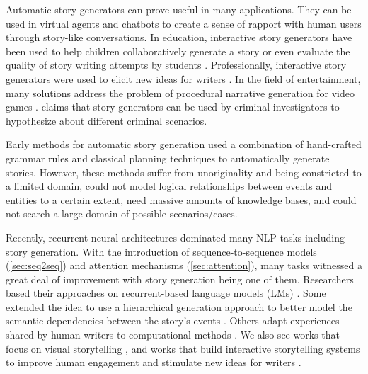 Automatic story generators can prove useful in many applications. They can be used in virtual agents and chatbots to create a sense of rapport with human users through story-like conversations. In education, interactive story generators have been used to help children collaboratively generate a story \citep{robertson2003using} or even evaluate the quality of story writing attempts by students \citep{halpin2004towards}. Professionally, interactive story generators were used to elicit new ideas for writers \citep{clark2018creative}. In the field of entertainment, many solutions address the problem of procedural narrative generation for video games \citep{griffith2018procedural}. \citep{martin2021neurosymbolic} claims that story generators can be used by criminal investigators to hypothesize about different criminal scenarios.

Early methods for automatic story generation used a combination of hand-crafted grammar rules \citep{ryan2017grimes, rumelhart1975notes, thorndyke1977cognitive, wilensky1983story} and classical planning techniques \citep{meehan1977tale, dehn1981story, lebowitz1984creating, lebowitz1985story, cavazza2002character, porteous2009controlling, riedl2010narrative} to automatically generate stories. However, these methods suffer from unoriginality and being constricted to a limited domain, could not model logical relationships between events and entities to a certain extent, need massive amounts of knowledge bases, and could not search a large domain of possible scenarios/cases.

Recently, recurrent neural architectures dominated many NLP tasks including story generation. With the introduction of sequence-to-sequence models (\cref{sec:seq2seq}) and attention mechanisms (\cref{sec:attention}), many tasks witnessed a great deal of improvement with story generation being one of them. Researchers based their approaches on recurrent-based language models (LMs) \citep{choi2016recurrent, harrison2017toward}. Some extended the idea to use a hierarchical generation approach to better model the semantic dependencies between the story's events \citep{martin2018event, xu2018skeleton, fan2018hierarchical}. Others adapt experiences shared by human writers to computational methods \citep{yao2019plan, yu2020draft}. We also see works that focus on visual storytelling \citep{huang2016visual, wang2018no, kim2018glac}, and works that build interactive storytelling systems to improve human engagement and stimulate new ideas for writers \citep{clark2018creative, goldfarb2019plan}.

